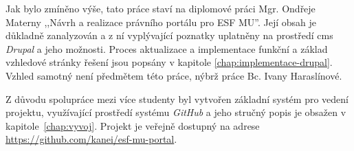 Jak bylo zmíněno výše, tato práce staví na diplomové práci Mgr. Ondřeje Materny ,,Návrh a realizace právního portálu pro ESF MU''\cite{omaterna2013}. Její obsah je důkladně zanalyzován a z ní vyplývající poznatky uplatněny na prostředí \gls{cms} \emph{Drupal} a jeho možnosti. Proces aktualizace a implementace funkční a základ vzhledové stránky řešení jsou popsány v kapitole  \ref{chap:implementace-drupal}. Vzhled samotný není předmětem této práce, nýbrž práce Bc. Ivany Haraslínové. 

Z důvodu spolupráce mezi více studenty byl vytvořen základní systém pro vedení projektu, využívající prostředí systému \emph{GitHub} a jeho stručný popis je obsažen v kapitole~\ref{chap:vyvoj}. Projekt je veřejně dostupný na adrese \url{https://github.com/kanei/esf-mu-portal}.
